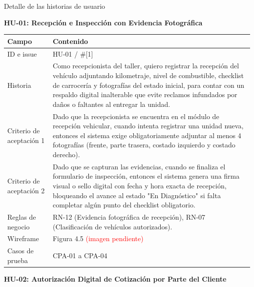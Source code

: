 Detalle de las historias de usuario

\textbf{HU-01: Recepción e Inspección con Evidencia Fotográfica}

{\def\LTcaptype{none} %
\begin{longtable}[]{@{}
  >{\raggedright\arraybackslash}p{}
  >{\raggedright\arraybackslash}p{}@{}}
\toprule\noalign{}
\begin{minipage}[b]{\linewidth}\raggedright
\textbf{Campo}
\end{minipage} & \begin{minipage}[b]{\linewidth}\raggedright
\textbf{Contenido}
\end{minipage} \\
\midrule\noalign{}
\endhead
\bottomrule\noalign{}
\endlastfoot
ID e issue & HU-01 / \#{[}1{]} \\
Historia & Como recepcionista del taller, quiero registrar la recepción
del vehículo adjuntando kilometraje, nivel de combustible, checklist de
carrocería y fotografías del estado inicial, para contar con un respaldo
digital inalterable que evite reclamos infundados por daños o faltantes
al entregar la unidad. \\
Criterio de aceptación 1 & Dado que la recepcionista se encuentra en el
módulo de recepción vehicular, cuando intenta registrar una unidad
nueva, entonces el sistema exige obligatoriamente adjuntar al menos 4
fotografías (frente, parte trasera, costado izquierdo y costado
derecho). \\
Criterio de aceptación 2 & Dado que se capturan las evidencias, cuando
se finaliza el formulario de inspección, entonces el sistema genera una
firma visual o sello digital con fecha y hora exacta de recepción,
bloqueando el avance al estado "En Diagnóstico" si falta completar algún
punto del checklist obligatorio. \\
Reglas de negocio & RN-12 (Evidencia fotográfica de recepción), RN-07
(Clasificación de vehículos autorizados). \\
Wireframe & Figura 4.5 \textcolor{red}{(imagen pendiente)} \\
Casos de prueba & CPA-01 a CPA-04 \\
\end{longtable}
}

\textbf{HU-02: Autorización Digital de Cotización por Parte del Cliente}

